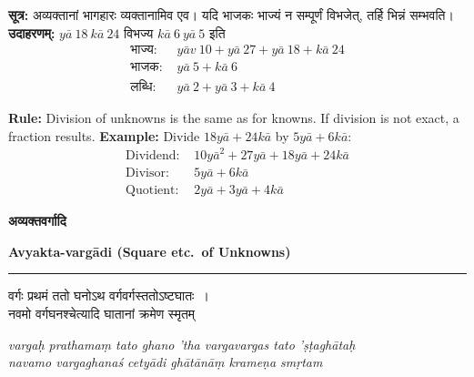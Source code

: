 \documentclass[11pt,a4paper]{article}
\newcommand{\dev}[1]{{\devanagarifont #1}}
\newcommand{\bicol}[2]{%
\noindent%
\begin{minipage}[t]{0.48\textwidth}
\begin{flushleft}
\small
#1
\end{flushleft}
\end{minipage}%
\hfill%
\begin{minipage}[t]{0.48\textwidth}
\begin{flushleft}
\small
#2
\end{flushleft}
\end{minipage}%
\vspace{0.4em}
}
\newcommand{\bicolverse}[2]{%
\par\noindent%
\begin{minipage}[t]{0.48\textwidth}
\centering
\color{versecolor}
\devanagarifont
\small
#1
\end{minipage}%
\hfill%
\begin{minipage}[t]{0.48\textwidth}
\centering
\color{versecolor}
\small
#2
\end{minipage}%
\par\vspace{0.4em}
}
\newcommand{\sectionbicol}[2]{%
\vspace{0.5em}
\noindent%
\begin{minipage}[t]{0.48\textwidth}
\begin{center}
\large\bfseries\color{sectioncolor}
\dev{#1}
\end{center}
\end{minipage}%
\hfill%
\begin{minipage}[t]{0.48\textwidth}
\begin{center}
\large\bfseries\color{sectioncolor}
#2
\end{center}
\end{minipage}%
\vspace{0.3em}
\noindent\rule{\textwidth}{0.4pt}
}
\begin{document}
\bicol{%
\textbf{सूत्र:} अव्यक्तानां भागहारः व्यक्तानामिव एव। यदि भाजकः भाज्यं न सम्पूर्णं विभजेत्, तर्हि भिन्नं सम्भवति।
\textbf{उदाहरणम्:} $y\bar{a}\ 18\ k\bar{a}\ 24$ विभज्य $k\bar{a}\ 6\ y\bar{a}\ 5$ इति
\begin{align*}
\text{भाज्य: }& y\bar{a}v\ 10 + y\bar{a}\ 27 + y\bar{a}\ 18 + k\bar{a}\ 24 \\
\text{भाजक: }& y\bar{a}\ 5 + k\bar{a}\ 6 \\
\text{लब्धि: }& y\bar{a}\ 2 + y\bar{a}\ 3 + k\bar{a}\ 4
\end{align*}
}{%
\textbf{Rule:} Division of unknowns is the same as for knowns. If division is not exact, a fraction results.
\textbf{Example:} Divide $18y\bar{a} + 24k\bar{a}$ by $5y\bar{a} + 6k\bar{a}$:
\begin{align*}
\text{Dividend: }& 10y\bar{a}^2 + 27y\bar{a} + 18y\bar{a} + 24k\bar{a} \\
\text{Divisor: }& 5y\bar{a} + 6k\bar{a} \\
\text{Quotient: }& 2y\bar{a} + 3y\bar{a} + 4k\bar{a}
\end{align*}
}

\clearpage

\sectionbicol{अव्यक्तवर्गादि}{Avyakta-varg\={a}di (Square etc.~of Unknowns)}

\vspace{0.3cm}

\bicolverse{%
वर्गः प्रथमं ततो घनोऽथ वर्गवर्गस्ततोऽष्टघातः~।\\
नवमो वर्गघनश्चेत्यादि घातानां क्रमेण स्मृतम्~
}{%
\textit{varga\d{h} prathama\d{m} tato ghano 'tha vargavargas tato '\d{s}\d{t}agh\={a}ta\d{h}}\\
\textit{navamo vargaghana\'{s} cety\={a}di gh\={a}t\={a}n\={a}\d{m} krame\d{n}a sm\d{r}tam}
}

\vspace{0.5cm}
\end{document}
